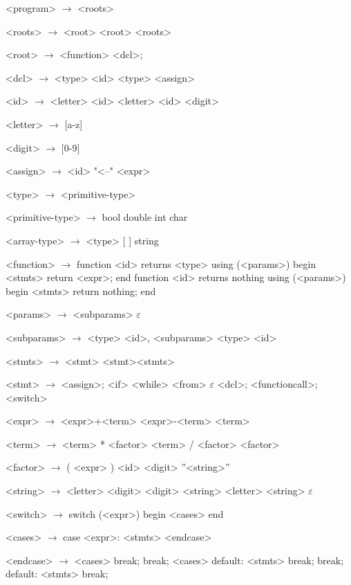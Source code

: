 \documentclass{article}
\begin{document}
\begin{grammar}
<program> $\rightarrow$ <roots>

<roots> $\rightarrow$ <root>
\alt <root> <roots>

<root> $\rightarrow$ <function>
\alt <dcl>;

<dcl> $\rightarrow$ <type> <id>
\alt <type> <assign>

<id> $\rightarrow$ <letter>
	\alt<id> <letter>
	\alt<id> <digit>

<letter> $\rightarrow$ [a-z]
	\alt [A-Z]

<digit> $\rightarrow$ [0-9]

<assign>  $\rightarrow$ <id> "<--" <expr>

<type> $\rightarrow$ <primitive-type>

<primitive-type> $\rightarrow$ bool
\alt double
\alt int
\alt char

<array-type> $\rightarrow$ <type> [ ]
\alt string

<function> $\rightarrow$  function <id> returns <type> using (<params>)
begin
	<stmts>
	return <expr>;
end
\alt function <id> returns nothing using (<params>)
begin
	<stmts>
	return nothing;
end

<params> $\rightarrow$ <subparams>
	\alt $\varepsilon$

<subparams> $\rightarrow$ <type> <id>, <subparams>
\alt <type> <id>

<stmts> $\rightarrow$ <stmt>
	\alt <stmt><stmts>

<stmt> $\rightarrow$ <assign>;
	\alt <if>
	\alt <while>
	\alt <from>
	\alt $\varepsilon$
	\alt <dcl>;
	\alt <functioncall>;
	\alt <switch>

<expr> $\rightarrow$ <expr>+<term>
	\alt<expr>-<term>
	\alt<term>

<term> $\rightarrow$ <term> * <factor>
	\alt <term> / <factor>
	\alt <factor>

<factor> $\rightarrow$ ( <expr> )
	\alt <id>
	\alt <digit>
	\alt ''<string>''

<string> $\rightarrow$ <letter>
\alt <digit>
\alt <digit> <string>
\alt <letter> <string>
\alt $\varepsilon$

<switch> $\rightarrow$ switch (<expr>)
		begin
			<cases>
		end

<cases> $\rightarrow$ case <expr>:
			<stmts>
		<endcase>
		
<endcase> $\rightarrow$ <cases>
		\alt break;
		\alt break;
		<cases>
		\alt default:
			<stmts>
			break;
		\alt break;
		default:
			<stmts>
			break;


\end{grammar}
\end{document}
